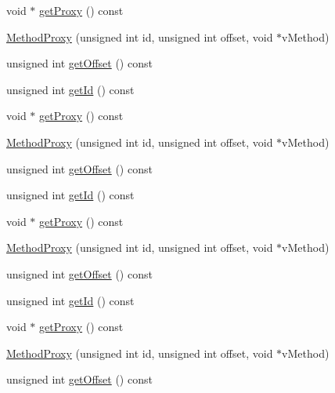 \begin{DoxyCompactItemize}
\item 
void $\ast$ \mbox{\hyperlink{structfakeit_1_1MethodProxy_ab27c6485484c610f7a35bb832fc571ea}{get\+Proxy}} () const
\item 
\mbox{\hyperlink{structfakeit_1_1MethodProxy_a425b37c610166fd5368505aa53cc970c}{Method\+Proxy}} (unsigned int id, unsigned int offset, void $\ast$v\+Method)
\item 
unsigned int \mbox{\hyperlink{structfakeit_1_1MethodProxy_abc59fc5a670eda3f83c981cf4ac7bd68}{get\+Offset}} () const
\item 
unsigned int \mbox{\hyperlink{structfakeit_1_1MethodProxy_a00370ab06d9c4f4b9affb9ec3bdd72fe}{get\+Id}} () const
\item 
void $\ast$ \mbox{\hyperlink{structfakeit_1_1MethodProxy_ab27c6485484c610f7a35bb832fc571ea}{get\+Proxy}} () const
\item 
\mbox{\hyperlink{structfakeit_1_1MethodProxy_a425b37c610166fd5368505aa53cc970c}{Method\+Proxy}} (unsigned int id, unsigned int offset, void $\ast$v\+Method)
\item 
unsigned int \mbox{\hyperlink{structfakeit_1_1MethodProxy_abc59fc5a670eda3f83c981cf4ac7bd68}{get\+Offset}} () const
\item 
unsigned int \mbox{\hyperlink{structfakeit_1_1MethodProxy_a00370ab06d9c4f4b9affb9ec3bdd72fe}{get\+Id}} () const
\item 
void $\ast$ \mbox{\hyperlink{structfakeit_1_1MethodProxy_ab27c6485484c610f7a35bb832fc571ea}{get\+Proxy}} () const
\item 
\mbox{\hyperlink{structfakeit_1_1MethodProxy_a425b37c610166fd5368505aa53cc970c}{Method\+Proxy}} (unsigned int id, unsigned int offset, void $\ast$v\+Method)
\item 
unsigned int \mbox{\hyperlink{structfakeit_1_1MethodProxy_abc59fc5a670eda3f83c981cf4ac7bd68}{get\+Offset}} () const
\item 
unsigned int \mbox{\hyperlink{structfakeit_1_1MethodProxy_a00370ab06d9c4f4b9affb9ec3bdd72fe}{get\+Id}} () const
\item 
void $\ast$ \mbox{\hyperlink{structfakeit_1_1MethodProxy_ab27c6485484c610f7a35bb832fc571ea}{get\+Proxy}} () const
\item 
\mbox{\hyperlink{structfakeit_1_1MethodProxy_a425b37c610166fd5368505aa53cc970c}{Method\+Proxy}} (unsigned int id, unsigned int offset, void $\ast$v\+Method)
\item 
unsigned int \mbox{\hyperlink{structfakeit_1_1MethodProxy_abc59fc5a670eda3f83c981cf4ac7bd68}{get\+Offset}} () const
\item 

\end{DoxyCompactItemize}
